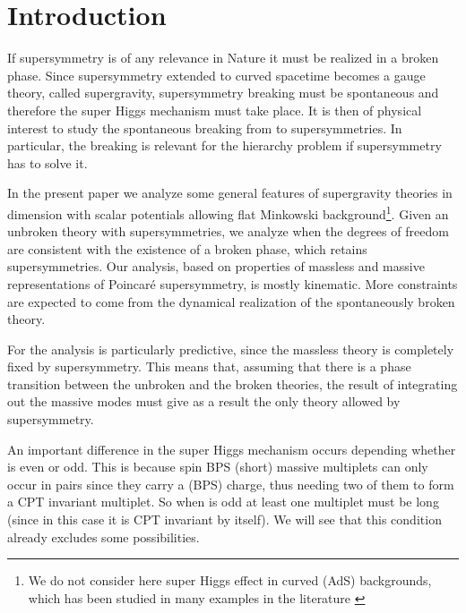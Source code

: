 \documentclass[a4paper,12pt]{article}
\begin{document}
\vfill\eject

\section{Introduction}

If supersymmetry is of any relevance in Nature it must be realized in a broken phase.
 Since supersymmetry extended to
 curved spacetime becomes a gauge theory, called supergravity, supersymmetry breaking must
  be spontaneous and therefore the
  super Higgs mechanism must take place. It is then of physical interest to study  the spontaneous
  breaking from  \coordHE{} to \coordHE{}
supersymmetries. In particular, the breaking \coordHE{} is relevant for the hierarchy
 problem if supersymmetry has to solve it.



In the present paper we analyze some general features of
supergravity theories in dimension \coordHE{} with scalar potentials \cite{dwn,war} allowing
 flat
Minkowski background\footnote{ We do not consider here super Higgs
effect in curved (AdS) backgrounds, which has been studied in many
examples in the literature  \cite{war,hw1}}.
 Given an unbroken theory with \coordHE{} supersymmetries, we analyze when the degrees of freedom are consistent
  with the existence of a broken phase, which retains \coordHE{} supersymmetries.
Our analysis,  based on properties of massless and massive
representations \cite{fsz,st} of Poincar\'e supersymmetry,
 is mostly kinematic. More constraints are expected to come from the dynamical realization of the spontaneously
  broken theory.

For \coordHE{} \cite{ccfdfm} the analysis is particularly predictive, since the massless  theory
 is completely fixed by supersymmetry. This means that, assuming that there is a phase transition between the
  unbroken and the broken theories, the result of integrating out  the massive modes must give as a result the
   only theory allowed by  \coordHE{} supersymmetry.


An important difference in the super Higgs mechanism occurs depending whether \coordHE{} is even or odd. This is
 because spin \coordHE{} BPS (short)  massive  multiplets can only occur in pairs since they carry a (BPS) charge,
  thus needing two of them to  form a  CPT invariant multiplet. So when \coordHE{} is odd at least one multiplet
  must be long (since in this case  it is  CPT invariant by itself). We will see that this condition already
  excludes some possibilities.
\end{document}

